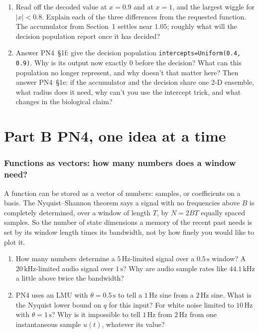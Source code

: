 \documentclass[11pt,letterpaper]{article}
\begin{document}
\begin{enumerate}
\item Read off the decoded value at $x = 0.9$ and at $x = 1$, and the largest wiggle for $|x| < 0.8$. Explain each of the three differences from the requested function. The accumulator from Section~1 settles near $1.05$; roughly what will the decision population report once it has decided?
\item Answer PN4~\S1f: give the decision population \texttt{intercepts=Uniform(0.4, 0.9)}. Why is its output now exactly $0$ before the decision? What can this population no longer represent, and why doesn't that matter here? Then answer PN4~\S1e: if the accumulator and the decision share one 2-D ensemble, what radius does it need, why can't you use the intercept trick, and what changes in the biological claim?
\end{enumerate}

\part*{Part B \quad PN4, one idea at a time}

\section{Functions as vectors: how many numbers does a window need?}

\begin{idea}
A function can be stored as a vector of numbers: samples, or coefficients on a basis. The Nyquist--Shannon theorem says a signal with no frequencies above $B$ is completely determined, over a window of length $T$, by $N = 2BT$ equally spaced samples. So the number of state dimensions a memory of the recent past needs is set by its window length times its bandwidth, not by how finely you would like to plot it.
\end{idea}

\begin{enumerate}
\item How many numbers determine a $5\,\mathrm{Hz}$-limited signal over a $0.5\,\mathrm{s}$ window? A $20\,\mathrm{kHz}$-limited audio signal over $1\,\mathrm{s}$? Why are audio sample rates like $44.1\,\mathrm{kHz}$ a little above twice the bandwidth?
\item PN4 uses an LMU with $\theta = 0.5\,\mathrm{s}$ to tell a $1\,\mathrm{Hz}$ sine from a $2\,\mathrm{Hz}$ sine. What is the Nyquist lower bound on $q$ for this input? For white noise limited to $10\,\mathrm{Hz}$ with $\theta = 1\,\mathrm{s}$? Why is it impossible to tell $1\,\mathrm{Hz}$ from $2\,\mathrm{Hz}$ from one instantaneous sample $u(t)$, whatever its value?
\end{enumerate}
\end{document}
